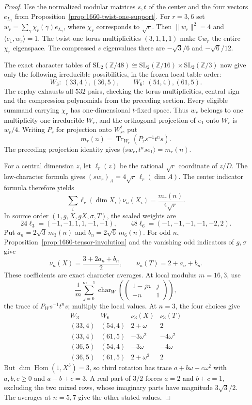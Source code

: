 \begin{proof}
Use the normalized modular matrices $s,t$ of the center and the four
vectors $e_{L_\gamma}$ from
Proposition~\ref{prop:1660-twist-one-support}. For $r=3,6$ set
$w_r=\sum_\gamma\chi_r(\gamma)e_{L_\gamma}$, where $\chi_r$
corresponds to $\sqrt r$. Then $\|w_r\|^2=4$ and
$\langle e_1,w_r\rangle=1$. The twist-one torus multiplicities
$(3,1,1,1)$ make $\mathbb Cw_r$ the entire $\chi_r$ eigenspace.
The compressed $s$ eigenvalues there are $-\sqrt3/6$ and
$-\sqrt6/12$.

The exact character tables of
$\mathrm{SL}_2(\mathbb Z/48)\cong
\mathrm{SL}_2(\mathbb Z/16)\times\mathrm{SL}_2(\mathbb Z/3)$
now give only the following irreducible possibilities, in the frozen
local table order:
\[
 W_3:\ (33,4),(36,5),\qquad
 W_6:\ (54,4),(61,5).
\]
The replay exhausts all $532$ pairs, checking the torus multiplicities,
central sign and the compression polynomials from the preceding section.
Every eligible summand carrying $\chi_r$ has one-dimensional $t$-fixed
space. Thus $w_r$ belongs to one multiplicity-one irreducible $W_r$,
and the orthogonal projection of $e_1$ onto $W_r$ is $w_r/4$.
Writing $P_r$ for projection onto $W_r^t$, put
\[
 m_r(n)=\operatorname{Tr}_{W_r}(P_rs^{-1}t^ns).
\]
The preceding projection identity gives
$\langle sw_r,t^nse_1\rangle=m_r(n)$.

For a central dimension $z$, let $\ell_r(z)$ be the rational
$\sqrt r$ coordinate of $z/D$. The low-character formula gives
$(sw_r)_A=4\sqrt r\,\ell_r(\dim A)$. The center indicator formula
therefore yields
\[
 \sum_i\ell_r(\dim X_i)\nu_n(X_i)
 =\frac{m_r(n)}{4\sqrt r}.
\]
In source order $(1,g,X,gX,\sigma,T)$, the scaled weights are
\[
 24\ell_3=(-1,-1,1,1,-1,-1),\qquad
 48\ell_6=(-1,-1,-1,-1,-2,2).
\]
Put $a_n=2\sqrt3\,m_3(n)$ and $b_n=2\sqrt6\,m_6(n)$.
For odd $n$, Proposition~\ref{prop:1660-tensor-involution} and the
vanishing odd indicators of $g,\sigma$ give
\[
 \nu_n(X)=\frac{3+2a_n+b_n}{2},\qquad
 \nu_n(T)=2+a_n+b_n.
\]
These coefficients are exact character averages. At local modulus
$m=16,3$, use
\[
 \frac1m\sum_{j=0}^{m-1}
 \operatorname{char}_{W}\!\left(
 \begin{pmatrix}1-jn&j\\-n&1\end{pmatrix}\right),
\]
the trace of $P_Ws^{-1}t^ns$; multiply the local values.
At $n=3$, the four choices give
\[
\begin{array}{c|c|c|c}
 W_3&W_6&\nu_3(X)&\nu_3(T)\\\hline
 (33,4)&(54,4)&2+\omega&2\\
 (33,4)&(61,5)&-3\omega^2&-4\omega^2\\
 (36,5)&(54,4)&-3\omega&-4\omega\\
 (36,5)&(61,5)&2+\omega^2&2
\end{array}
\]
But $\dim\operatorname{Hom}(1,X^3)=3$, so third rotation has trace
$a+b\omega+c\omega^2$ with $a,b,c\geq0$ and $a+b+c=3$.
A real part of $3/2$ forces $a=2$ and $b+c=1$, excluding the two
mixed rows, whose imaginary parts have magnitude $3\sqrt3/2$.
The averages at $n=5,7$ give the other stated values.
\end{proof}

